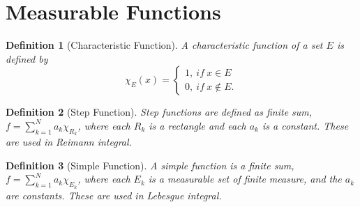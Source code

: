 \documentclass{report}
\theoremstyle{upthm}
\newtheorem{defn}{Definition}
\begin{document}
\section{Measurable Functions}
\begin{defn}[Characteristic Function]
	A characteristic function of a set $E$ is defined by 
	$$
	 \chi_E(x) = \begin{cases}
	1,\ if\ x \in E \\
	0,\ if\ x \notin E.
	\end{cases}
	$$
\end{defn}
\begin{defn}[Step Function]
	Step functions are defined as finite sum, $ f = \sum_{k=1}^{N} a_k \chi_{R_k} $, where each $R_k$ is a rectangle and each $a_k$ is a constant. These are used in Reimann integral.
\end{defn}
\begin{defn}[Simple Function]
	A simple function is a finite sum,  $ f = \sum_{k=1}^{N} a_k \chi_{E_k} $, where each $E_k$ is a measurable set of finite measure, and the $a_k$ are constants. These are used in Lebesgue integral.
\end{defn}
\end{document}
